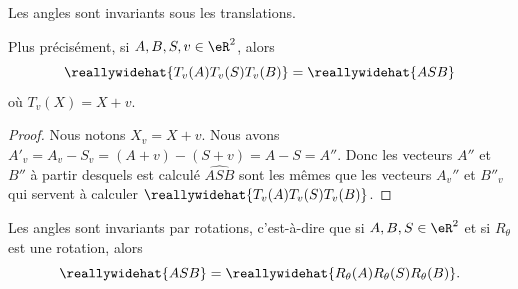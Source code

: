 \begin{proposition}      \label{PROPooKVSHooRODGWE}
	Les angles sont invariants sous les translations.

	Plus précisément, si \( A,B,S,v\in \eR^2\), alors
	\begin{equation}
		\reallywidehat{T_v(A)T_v(S)T_v(B)}=\reallywidehat{ASB}
	\end{equation}
	où \( T_v(X)=X+v\).
\end{proposition}

\begin{proof}
	Nous notons \( X_v=X+v\). Nous avons \( A'_v=A_v-S_v=(A+v)-(S+v)=A-S=A''\). Donc les vecteurs \( A''\) et \( B''\) à partir desquels est calculé \( \widehat{ASB}\) sont les mêmes que les vecteurs \(  A_v'' \) et \( B''_v\) qui servent à calculer \( \reallywidehat{T_v(A)T_v(S)T_v(B)}\).
\end{proof}

\begin{proposition}      \label{PROPooYWKJooRjybUJ}
	Les angles sont invariants par rotations, c'est-à-dire que si \( A,B,S\in \eR^2\) et si \( R_{\theta}\) est une rotation, alors
	\begin{equation}
		\reallywidehat{ASB}=\reallywidehat{R_{\theta}(A)R_{\theta}(S)R_{\theta}(B)}.
	\end{equation}
\end{proposition}

